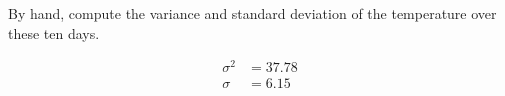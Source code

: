 By hand, compute the variance and standard deviation of the temperature over these ten days.

\begin{solution}
    \begin{align*}
        \sigma^2 &= 37.78 \\
        \sigma &= 6.15
    \end{align*}
\end{solution}